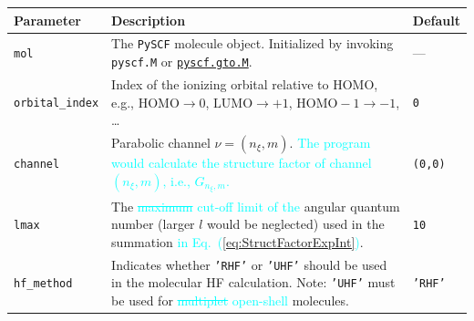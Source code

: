 \documentclass[preprint,12pt]{elsarticle} %
\renewcommand{\rm}[1]{\mathrm{#1}}    %
\newcommand{\cyan}[1]{\textcolor{cyan}{#1}}     %
\newcommand{\cout}[1]{\textcolor{cyan}{\sout{#1}}}
\begin{document}
\begin{table}[tb]
    \small
    \centering
    \begin{tabular}{l p{9cm} l}
        \hline \hline
        Parameter                   & Description                                                                                               & Default           \\
        \hline
        \texttt{mol}                & The \texttt{PySCF} molecule object. Initialized by invoking \texttt{pyscf.M} or
                                      \href{https://pyscf.org/pyscf_api_docs/pyscf.gto.html#module-pyscf.gto.mole}{\texttt{pyscf.gto.M}}.
                                                                                                                                                & ---               \\
        \texttt{orbital\_index}     & Index of the ionizing orbital relative to HOMO, e.g., $\rm{HOMO} \rightarrow 0$,
                                      $\rm{LUMO} \rightarrow +1$, $\rm{HOMO-1} \rightarrow -1$, …
                                                                                                                                                & \texttt{0}        \\
        \texttt{channel}            & Parabolic channel $\nu=(n_\xi, m)$.
                                      \cyan{The program would calculate the structure factor of channel $(n_\xi, m)$, i.e., $G_{n_\xi,m}$.}
                                                                                                                                                & \texttt{(0,0)}    \\
        \texttt{lmax}               & The \cout{maximum} \cyan{cut-off limit of the} angular quantum number (larger $l$ would be neglected)
                                      used in the summation \cyan{in Eq.~(\ref{eq:StructFactorExpInt})}.
                                                                                                                                                & \texttt{10}       \\
        \texttt{hf\_method}         & Indicates whether \texttt{'RHF'} or \texttt{'UHF'} should be used in the molecular HF calculation.
                                      Note: \texttt{'UHF'} must be used for \cout{multiplet} \cyan{open-shell} molecules.
                                                                                                                                                & \texttt{'RHF'}    \\

\end{tabular}
\end{table}
\end{document}
